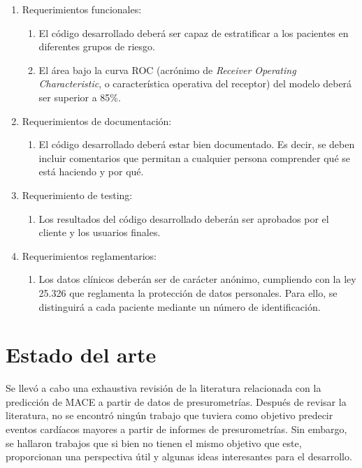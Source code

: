\begin{enumerate}
	\item Requerimientos funcionales:
		\begin{enumerate}
			\item El código desarrollado deberá ser 
			capaz de estratificar a los pacientes en diferentes grupos de riesgo.
			\item El área bajo la curva ROC (acrónimo de \emph{Receiver Operating Characteristic}, 
			o característica operativa del receptor) del modelo deberá ser superior a 85\%.
		\end{enumerate}
	\item Requerimientos de documentación:
		\begin{enumerate}
			\item El código desarrollado deberá estar bien documentado. 
			Es decir, se deben incluir comentarios que permitan a cualquier persona comprender
			qué se está haciendo y por qué. 
		\end{enumerate}
	\item Requerimiento de testing:
		\begin{enumerate}
			\item Los resultados del código desarrollado deberán ser aprobados por el cliente 
			y los usuarios finales.
		\end{enumerate}
	\item Requerimientos reglamentarios:
		\begin{enumerate}
			\item Los datos clínicos deberán ser de carácter anónimo, cumpliendo con la ley 25.326 que reglamenta la protección de datos personales. 
			Para ello, se distinguirá a cada paciente mediante un número de identificación.
		\end{enumerate}

\end{enumerate}




\section{Estado del arte}

Se llevó a cabo una exhaustiva revisión de la literatura relacionada con la predicción 
de MACE a partir de datos de presurometrías.
Después de revisar la literatura, no se encontró ningún trabajo que tuviera como objetivo predecir eventos 
cardíacos mayores a partir de informes de presurometrías. Sin embargo, se hallaron trabajos que si bien no 
tienen el mismo objetivo que este, proporcionan una perspectiva útil y algunas ideas interesantes
 para el desarrollo.

